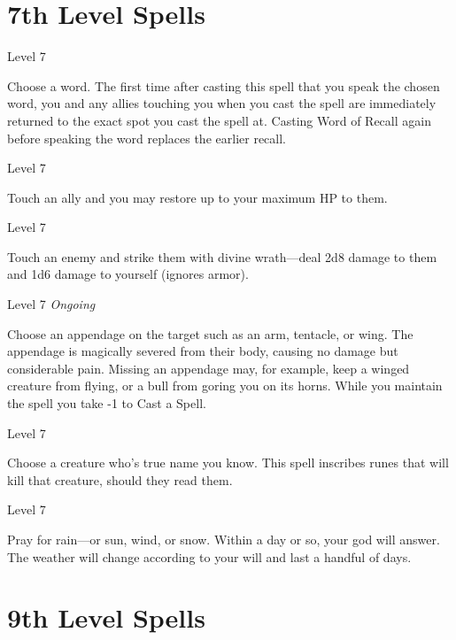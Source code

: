  




\section{7th Level Spells}     
 
\startSpellName
{} 	Level 7
\stopSpellName
 

Choose a word. The first time after casting this spell that you speak the chosen word, you and any allies touching you when you cast the spell are immediately returned to the exact spot you cast the spell at. Casting Word of Recall again before speaking the word replaces the earlier recall.

 
\startSpellName
{} 	Level 7
\stopSpellName
 

Touch an ally and you may restore up to your maximum HP to them.

 
\startSpellName
{} 	Level 7
\stopSpellName
 

Touch an enemy and strike them with divine wrath—deal 2d8 damage to them and 1d6 damage to yourself (ignores armor).

 
\startSpellName
{} 	Level 7	{\em Ongoing} 
\stopSpellName
 

Choose an appendage on the target such as an arm, tentacle, or wing. The appendage is magically severed from their body, causing no damage but considerable pain. Missing an appendage may, for example, keep a winged creature from flying, or a bull from goring you on its horns. While you maintain the spell you take -1 to Cast a Spell.

 
\startSpellName
{} 	Level 7
\stopSpellName
 

Choose a creature who's true name you know. This spell inscribes runes that will kill that creature, should they read them.

 
\startSpellName
{} 	Level 7
\stopSpellName
 

Pray for rain—or sun, wind, or snow. Within a day or so, your god will answer. The weather will change according to your will and last a handful of days.



 


\section{9th Level Spells}     
 
